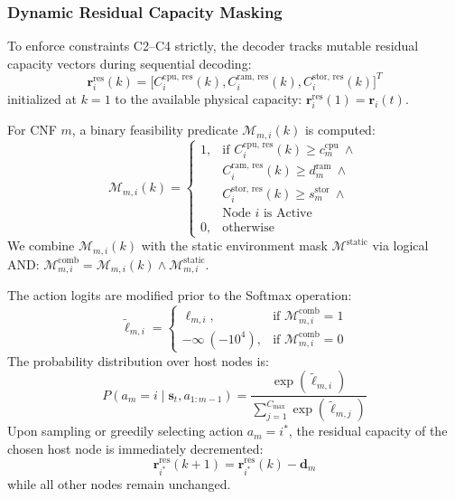 \documentclass[conference]{IEEEtran}
\begin{document}
\subsubsection{Dynamic Residual Capacity Masking}
To enforce constraints C2--C4 strictly, the decoder tracks mutable residual capacity vectors during sequential decoding:
\begin{equation}
\mathbf{r}_i^{\text{res}}(k) = \big[ C_i^{\text{cpu, res}}(k), C_i^{\text{ram, res}}(k), C_i^{\text{stor, res}}(k) \big]^T
\end{equation}
initialized at $k=1$ to the available physical capacity: $\mathbf{r}_i^{\text{res}}(1) = \mathbf{r}_i(t)$.

For CNF $m$, a binary feasibility predicate $\mathcal{M}_{m, i}(k)$ is computed:
\begin{equation}
\mathcal{M}_{m, i}(k) = \begin{cases}
1, & \text{if } C_i^{\text{cpu, res}}(k) \ge c_m^{\text{cpu}} \ \land \\
   & C_i^{\text{ram, res}}(k) \ge d_m^{\text{ram}} \ \land \\
   & C_i^{\text{stor, res}}(k) \ge s_m^{\text{stor}} \ \land \\
   & \text{Node } i \text{ is Active} \\
0, & \text{otherwise}
\end{cases}
\label{eq:dyn_mask}
\end{equation}
We combine $\mathcal{M}_{m, i}(k)$ with the static environment mask $\mathcal{M}^{\text{static}}$ via logical AND: $\mathcal{M}_{m, i}^{\text{comb}} = \mathcal{M}_{m, i}(k) \land \mathcal{M}_{m, i}^{\text{static}}$.

The action logits are modified prior to the Softmax operation:
\begin{equation}
\tilde{\ell}_{m, i} = \begin{cases}
\ell_{m, i}, & \text{if } \mathcal{M}_{m, i}^{\text{comb}} = 1 \\
-\infty \ (-10^4), & \text{if } \mathcal{M}_{m, i}^{\text{comb}} = 0
\end{cases}
\end{equation}
The probability distribution over host nodes is:
\begin{equation}
P(a_m = i \mid \mathbf{s}_t, a_{1:m-1}) = \frac{\exp(\tilde{\ell}_{m, i})}{\sum_{j=1}^{C_{\max}} \exp(\tilde{\ell}_{m, j})}
\end{equation}
Upon sampling or greedily selecting action $a_m = i^*$, the residual capacity of the chosen host node is immediately decremented:
\begin{equation}
\mathbf{r}_{i^*}^{\text{res}}(k+1) = \mathbf{r}_{i^*}^{\text{res}}(k) - \mathbf{d}_m
\end{equation}
while all other nodes remain unchanged.
\end{document}
